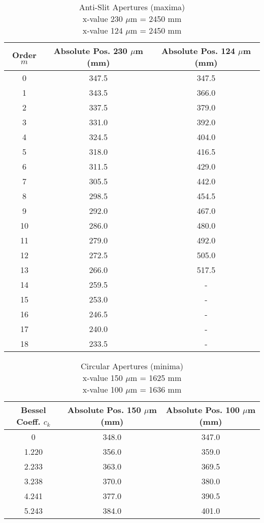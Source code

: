 \begin{appendix}
	\begin{table}[H]
		\centering
		\begin{tabular}{c|c|c}
			Order $m$ & Absolute Pos. 230 $\mu$m (mm) & Absolute Pos. 124 $\mu$m (mm) \\
			\hline\hline
			0 & 347.5 & 347.5 \\ \hline
			1 & 343.5 & 366.0 \\ \hline
			2 & 337.5 & 379.0 \\ \hline
			3 & 331.0 & 392.0 \\ \hline
			4 & 324.5 & 404.0 \\ \hline
			5 & 318.0 & 416.5 \\ \hline
			6 & 311.5 & 429.0 \\ \hline
			7 & 305.5 & 442.0 \\ \hline
			8 & 298.5 & 454.5 \\ \hline
			9 & 292.0 & 467.0 \\ \hline
			10 & 286.0 & 480.0 \\ \hline
			11 & 279.0 & 492.0 \\ \hline
			12 & 272.5 & 505.0 \\ \hline
			13 & 266.0 & 517.5 \\ \hline
			14 & 259.5 & - \\ \hline
			15 & 253.0 & - \\ \hline
			16 & 246.5 & - \\ \hline
			17 & 240.0 & - \\ \hline
			18 & 233.5 & - \\ \hline
		\end{tabular}
		\caption{Anti-Slit Apertures (maxima)\\x-value 230 $\mu$m = 2450 mm\\ x-value 124 $\mu$m = 2450 mm}
		\label{tab:Anti-Slit_Measurements}
	\end{table}

	\begin{table}[H]
		\centering
		\begin{tabular}{c|c|c}
			Bessel Coeff. $c_k$ & Absolute Pos. 150 $\mu$m (mm) & Absolute Pos. 100 $\mu$m (mm) \\
			\hline\hline
			0 & 348.0 & 347.0 \\ \hline
			1.220 & 356.0 & 359.0 \\ \hline
			2.233 & 363.0 & 369.5 \\ \hline
			3.238 & 370.0 & 380.0 \\ \hline
			4.241 & 377.0 & 390.5 \\ \hline
			5.243 & 384.0 & 401.0 \\ \hline
		\end{tabular}
		\caption{Circular Apertures (minima)\\x-value 150 $\mu$m = 1625 mm\\ x-value 100 $\mu$m = 1636 mm}
		\label{tab:Circular_Apertures_Measurements}
	\end{table}


\end{appendix}
